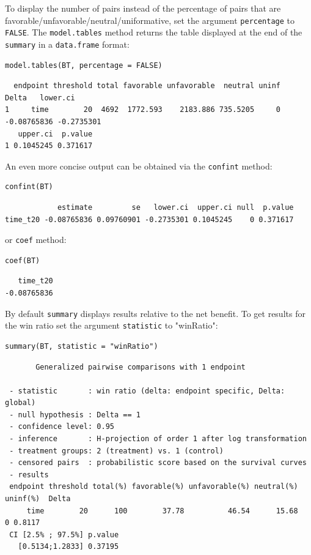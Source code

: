 \documentclass[12pt]{article}
\begin{document}
 To display the number of pairs instead of the percentage of pairs
that are favorable/unfavorable/neutral/uniformative, set the argument
\texttt{percentage} to \texttt{FALSE}. The \texttt{model.tables} method returns the table
displayed at the end of the \texttt{summary} in a \texttt{data.frame} format:
\lstset{language=r,label= ,caption= ,captionpos=b,numbers=none}
\begin{lstlisting}
model.tables(BT, percentage = FALSE)
\end{lstlisting}

\begin{verbatim}
  endpoint threshold total favorable unfavorable  neutral uninf       Delta   lower.ci
1     time        20  4692  1772.593    2183.886 735.5205     0 -0.08765836 -0.2735301
   upper.ci  p.value
1 0.1045245 0.371617
\end{verbatim}


\bigskip

An even more concise output can be obtained via the \texttt{confint} method:
\lstset{language=r,label= ,caption= ,captionpos=b,numbers=none}
\begin{lstlisting}
confint(BT)
\end{lstlisting}

\begin{verbatim}
            estimate         se   lower.ci  upper.ci null  p.value
time_t20 -0.08765836 0.09760901 -0.2735301 0.1045245    0 0.371617
\end{verbatim}


or \texttt{coef} method:
\lstset{language=r,label= ,caption= ,captionpos=b,numbers=none}
\begin{lstlisting}
coef(BT)
\end{lstlisting}

\begin{verbatim}
   time_t20 
-0.08765836
\end{verbatim}


By default \texttt{summary} displays results relative to the net benefit. To
get results for the win ratio set the argument \texttt{statistic} to
"winRatio":
\lstset{language=r,label= ,caption= ,captionpos=b,numbers=none}
\begin{lstlisting}
summary(BT, statistic = "winRatio")
\end{lstlisting}

\begin{verbatim}
       Generalized pairwise comparisons with 1 endpoint

 - statistic       : win ratio (delta: endpoint specific, Delta: global) 
 - null hypothesis : Delta == 1 
 - confidence level: 0.95 
 - inference       : H-projection of order 1 after log transformation 
 - treatment groups: 2 (treatment) vs. 1 (control) 
 - censored pairs  : probabilistic score based on the survival curves
 - results
 endpoint threshold total(%) favorable(%) unfavorable(%) neutral(%) uninf(%)  Delta
     time        20      100        37.78          46.54      15.68        0 0.8117
 CI [2.5% ; 97.5%] p.value 
   [0.5134;1.2833] 0.37195
\end{verbatim}
\end{document}
